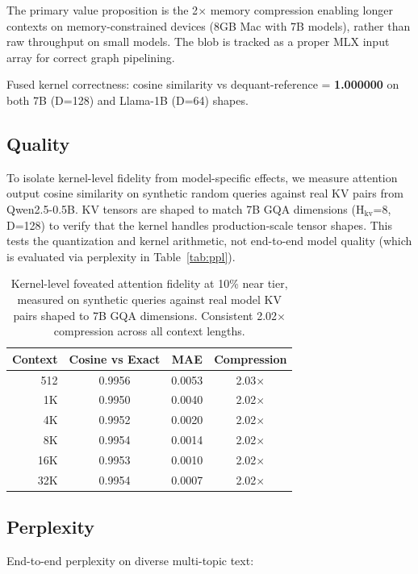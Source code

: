 \documentclass{article}
\begin{document}
The primary value proposition is the 2$\times$ memory compression
enabling longer contexts on memory-constrained devices (8GB Mac with
7B models), rather than raw throughput on small models. The blob is
tracked as a proper MLX input array for correct graph pipelining.

Fused kernel correctness: cosine similarity vs dequant-reference =
\textbf{1.000000} on both 7B (D=128) and Llama-1B (D=64) shapes.

\subsection{Quality}

To isolate kernel-level fidelity from model-specific effects, we
measure attention output cosine similarity on synthetic random queries
against real KV pairs from Qwen2.5-0.5B. KV tensors are shaped to
match 7B GQA dimensions (H$_\text{kv}$=8, D=128) to verify that the
kernel handles production-scale tensor shapes. This tests the
quantization and kernel arithmetic, not end-to-end model quality
(which is evaluated via perplexity in Table~\ref{tab:ppl}).

\begin{table}[h]
\centering
\begin{tabular}{rccc}
\toprule
Context & Cosine vs Exact & MAE & Compression \\
\midrule
512 & 0.9956 & 0.0053 & 2.03$\times$ \\
1K & 0.9950 & 0.0040 & 2.02$\times$ \\
4K & 0.9952 & 0.0020 & 2.02$\times$ \\
8K & 0.9954 & 0.0014 & 2.02$\times$ \\
16K & 0.9953 & 0.0010 & 2.02$\times$ \\
32K & 0.9954 & 0.0007 & 2.02$\times$ \\
\bottomrule
\end{tabular}
\caption{Kernel-level foveated attention fidelity at 10\% near tier,
measured on synthetic queries against real model KV pairs shaped to
7B GQA dimensions. Consistent 2.02$\times$ compression across all
context lengths.}
\end{table}

\subsection{Perplexity}

End-to-end perplexity on diverse multi-topic text:
\end{document}
